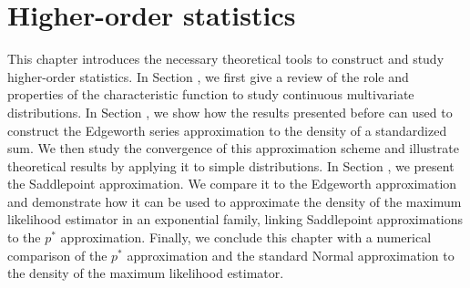\section{Higher-order statistics} \label{sec-ho-stats}

This chapter introduces the necessary theoretical tools to construct and study higher-order statistics. In Section , we first give a review of the role and properties of the characteristic function to study continuous multivariate distributions. In Section , we show how the results presented before can used to construct the Edgeworth series approximation to the density of a standardized sum. We then study the convergence of this approximation scheme and illustrate theoretical results by applying it to simple distributions. In Section , we present the Saddlepoint approximation. We compare it to the Edgeworth approximation and demonstrate how it can be used to approximate the density of the maximum likelihood estimator in an exponential family, linking Saddlepoint approximations to the $p^*$ approximation. Finally, we conclude this chapter with a numerical comparison of the $p^*$ approximation and the standard Normal approximation to the density of the maximum likelihood estimator.









